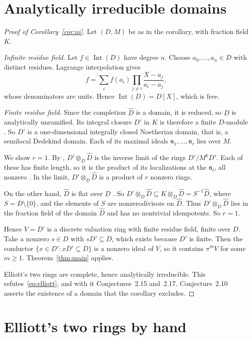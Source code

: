 \documentclass[11pt,a4paper]{article}
\theoremstyle{plain}
\theoremstyle{remark}
\newcommand{\Int}{\operatorname{Int}}
\begin{document}
\section{Analytically irreducible domains}

\begin{proof}[Proof of Corollary~\ref{cor:ai}]
Let $(D,M)$ be as in the corollary, with fraction field $K$.

\emph{Infinite residue field.} Let $f\in\Int(D)$ have degree $n$. Choose $a_0,\dots,a_n\in D$ with distinct residues.
Lagrange interpolation gives
\[
 f=\sum_i f(a_i)\prod_{j\neq i}\frac{X-a_j}{a_i-a_j},
\]
whose denominators are units. Hence $\Int(D)=D[X]$, which is free.

\emph{Finite residue field.} Since the completion $\hat D$ is a domain, it is reduced, so $D$ is analytically
unramified. Its integral closure $D'$ in $K$ is therefore a finite $D$-module \cite[Tag~032Y]{Stacks}. So $D'$ is a
one-dimensional integrally closed Noetherian domain, that is, a semilocal Dedekind domain. Each of its maximal
ideals $\mathfrak n_1,\dots,\mathfrak n_r$ lies over $M$.

We show $r=1$. By \cite[Proposition~10.13]{AM}, $D'\otimes_D\hat D$ is the inverse limit of the rings $D'/M^kD'$.
Each of these has finite length, so it is the product of its localizations at the $\mathfrak n_i$, all nonzero
\cite[Theorem~8.7]{AM}. In the limit, $D'\otimes_D\hat D$ is a product of $r$ nonzero rings.

On the other hand, $\hat D$ is flat over $D$ \cite[Proposition~10.14]{AM}. So $D'\otimes_D\hat D\subseteq
K\otimes_D\hat D=S^{-1}\hat D$, where $S=D\setminus\{0\}$, and the elements of $S$ are nonzerodivisors on $\hat D$.
Thus $D'\otimes_D\hat D$ lies in the fraction field of the domain $\hat D$ and has no nontrivial idempotents.
So $r=1$.

Hence $V=D'$ is a discrete valuation ring with finite residue field, finite over $D$. Take a nonzero $s\in D$ with
$sD'\subseteq D$, which exists because $D'$ is finite. Then the conductor $\{x\in D':xD'\subseteq D\}$ is a nonzero
ideal of $V$, so it contains $\pi^mV$ for some $m\geq1$. Theorem~\ref{thm:main} applies.

Elliott's two rings are complete, hence analytically irreducible. This refutes~\eqref{eq:elliott}, and with it
Conjectures~2.15 and~2.17. Conjecture~2.10 asserts the existence of a domain that the corollary excludes.
\end{proof}

\section{Elliott's two rings by hand}
\end{document}
